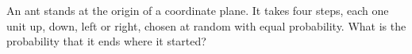 An ant stands at the origin of a coordinate plane. It takes four steps, each one unit up, down, left or right, chosen at random with equal probability. What is the probability that it ends where it started?
